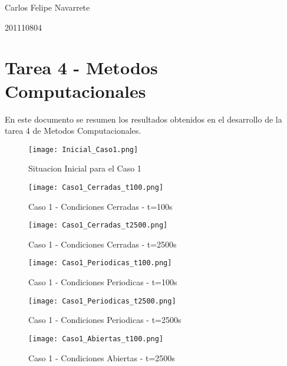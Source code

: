 \documentclass[12pt]{article}
\begin{document}
Carlos Felipe Navarrete

201110804


\section*{Tarea 4 - Metodos Computacionales}

En este documento se resumen los resultados obtenidos en el desarrollo de la tarea 4 de Metodos Computacionales.

\begin{figure}[h]
\begin{center}
\texttt{[image: Inicial\_Caso1.png]}
\end{center}
\caption{Situacion Inicial para el Caso 1}
\end{figure}

\begin{figure}[h]
\begin{center}
\texttt{[image: Caso1\_Cerradas\_t100.png]}
\end{center}
\caption{Caso 1 - Condiciones Cerradas - t=100s}
\end{figure}

\begin{figure}[h]
\begin{center}
\texttt{[image: Caso1\_Cerradas\_t2500.png]}
\end{center}
\caption{Caso 1 - Condiciones Cerradas - t=2500s}
\end{figure}


\begin{figure}[h]
\begin{center}
\texttt{[image: Caso1\_Periodicas\_t100.png]}
\end{center}
\caption{Caso 1 - Condiciones Periodicas - t=100s}
\end{figure}

\begin{figure}[h]
\begin{center}
\texttt{[image: Caso1\_Periodicas\_t2500.png]}
\end{center}
\caption{Caso 1 - Condiciones Periodicas - t=2500s}
\end{figure}

\begin{figure}[h]
\begin{center}
\texttt{[image: Caso1\_Abiertas\_t100.png]}
\end{center}
\caption{Caso 1 - Condiciones Abiertas - t=2500s}
\end{figure}
\end{document}
